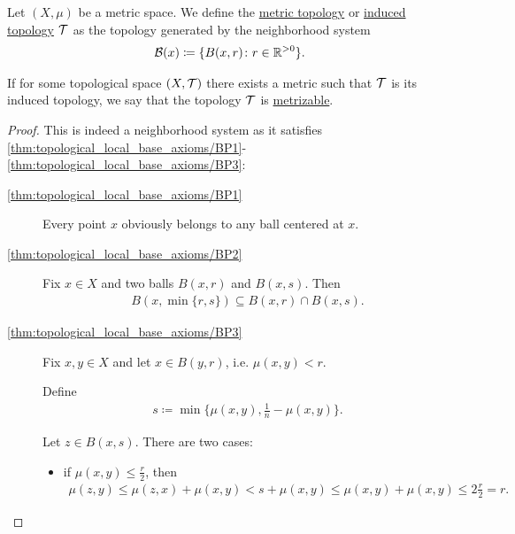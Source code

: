 \begin{definition}\label{def:metric_topology}\cite[249]{Engelking1989}
  Let $(X, \mu)$ be a metric space. We define the \ul{metric topology} or \ul{induced topology} $\mathcal T$ as the topology generated by the neighborhood system
  \begin{align*}
    \mathcal B(x) \coloneqq \{ B (x, r) \colon r \in \mathbb R^{>0} \}.
  \end{align*}

  If for some topological space $(X, \mathcal T)$ there exists a metric such that $\mathcal T$ is its induced topology, we say that the topology $\mathcal T$ is \ul{metrizable}.
\end{definition}
\begin{proof}
  This is indeed a neighborhood system as it satisfies \ref{thm:topological_local_base_axioms/BP1}-\ref{thm:topological_local_base_axioms/BP3}:

  \begin{description}
    \item[\ref{thm:topological_local_base_axioms/BP1}] Every point $x$ obviously belongs to any ball centered at $x$.

    \item[\ref{thm:topological_local_base_axioms/BP2}] Fix $x \in X$ and two balls $B(x, r)$ and $B(x, s)$. Then
    \begin{align*}
      B(x, \min\{ r, s \}) \subseteq B(x, r) \cap B(x, s).
    \end{align*}

    \item[\ref{thm:topological_local_base_axioms/BP3}] Fix $x, y \in X$ and let $x \in B(y, r)$, i.e. $\mu(x, y) < r$.

    Define
    \begin{align*}
      s \coloneqq \min\{ \mu(x, y), \frac 1 n - \mu(x, y) \}.
    \end{align*}

    Let $z \in B(x, s)$. There are two cases:
    \begin{itemize}
      \item if $\mu(x, y) \leq \tfrac r 2$, then
      \begin{align*}
        \mu(z, y)
        \leq
        \mu(z, x) + \mu(x, y)
        <
        s + \mu(x, y)
        \leq
        \mu(x, y) + \mu(x, y)
        \leq
        2 \tfrac r 2
        =
        r.
      \end{align*}


\end{itemize}
\end{description}
\end{proof}
